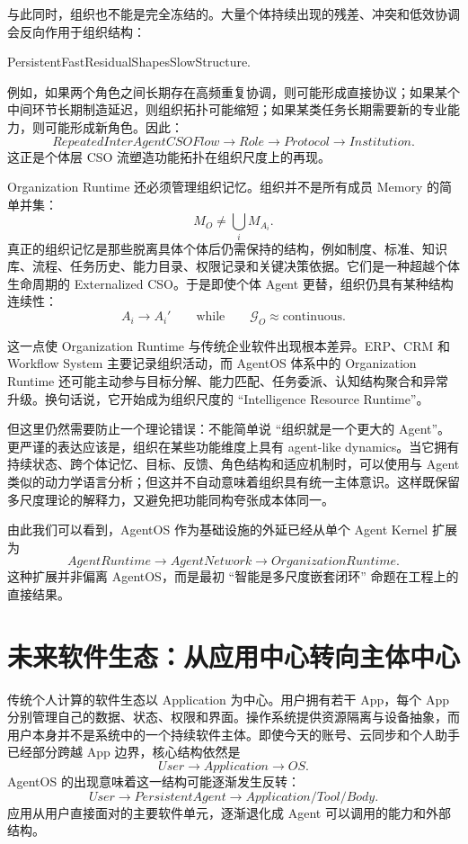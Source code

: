 与此同时，组织也不能是完全冻结的。大量个体持续出现的残差、冲突和低效协调会反向作用于组织结构：
\begin{statementbox}
PersistentFastResidualShapesSlowStructure.
\end{statementbox}
例如，如果两个角色之间长期存在高频重复协调，则可能形成直接协议；如果某个中间环节长期制造延迟，则组织拓扑可能缩短；如果某类任务长期需要新的专业能力，则可能形成新角色。因此：
\[
RepeatedInterAgentCSOFlow
\rightarrow
Role
\rightarrow
Protocol
\rightarrow
Institution.
\]
这正是个体层 CSO 流塑造功能拓扑在组织尺度上的再现。

Organization Runtime 还必须管理组织记忆。组织并不是所有成员 Memory 的简单并集：
\[
M_O
\neq
\bigcup_i M_{A_i}.
\]
真正的组织记忆是那些脱离具体个体后仍需保持的结构，例如制度、标准、知识库、流程、任务历史、能力目录、权限记录和关键决策依据。它们是一种超越个体生命周期的 Externalized CSO。于是即使个体 Agent 更替，组织仍具有某种结构连续性：
\[
A_i\rightarrow A_i'
\qquad\text{while}\qquad
\mathcal G_O\approx\mathrm{continuous}.
\]

这一点使 Organization Runtime 与传统企业软件出现根本差异。ERP、CRM 和 Workflow System 主要记录组织活动，而 AgentOS 体系中的 Organization Runtime 还可能主动参与目标分解、能力匹配、任务委派、认知结构聚合和异常升级。换句话说，它开始成为组织尺度的 ``Intelligence Resource Runtime''。

但这里仍然需要防止一个理论错误：不能简单说 ``组织就是一个更大的 Agent''。更严谨的表达应该是，组织在某些功能维度上具有 agent-like dynamics。当它拥有持续状态、跨个体记忆、目标、反馈、角色结构和适应机制时，可以使用与 Agent 类似的动力学语言分析；但这并不自动意味着组织具有统一主体意识。这样既保留多尺度理论的解释力，又避免把功能同构夸张成本体同一。

由此我们可以看到，AgentOS 作为基础设施的外延已经从单个 Agent Kernel 扩展为
\[
AgentRuntime
\rightarrow
AgentNetwork
\rightarrow
OrganizationRuntime.
\]
这种扩展并非偏离 AgentOS，而是最初 ``智能是多尺度嵌套闭环'' 命题在工程上的直接结果。

\section{未来软件生态：从应用中心转向主体中心}

传统个人计算的软件生态以 Application 为中心。用户拥有若干 App，每个 App 分别管理自己的数据、状态、权限和界面。操作系统提供资源隔离与设备抽象，而用户本身并不是系统中的一个持续软件主体。即使今天的账号、云同步和个人助手已经部分跨越 App 边界，核心结构依然是
\[
User
\rightarrow
Application
\rightarrow
OS.
\]
AgentOS 的出现意味着这一结构可能逐渐发生反转：
\[
User
\rightarrow
PersistentAgent
\rightarrow
Application/Tool/Body.
\]
应用从用户直接面对的主要软件单元，逐渐退化成 Agent 可以调用的能力和外部结构。

